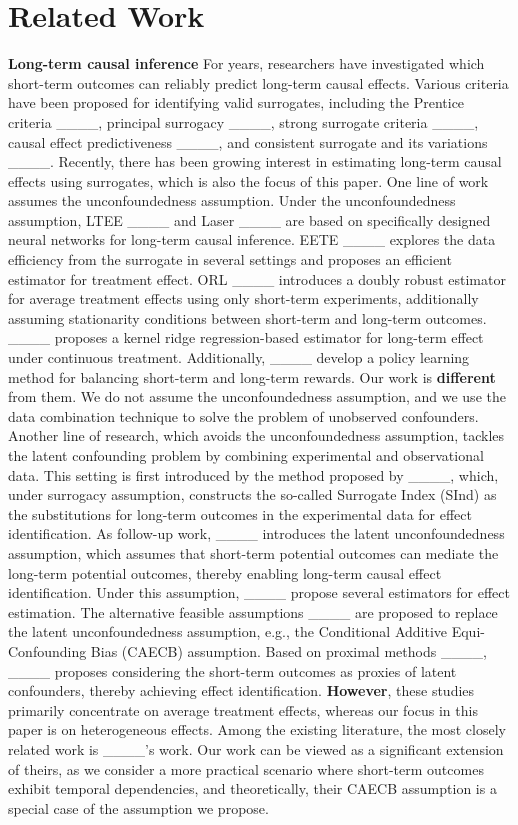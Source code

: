 \section{Related Work}
\label{related work}

\textbf{Long-term causal inference}
For years, researchers have investigated which short-term outcomes can reliably predict long-term causal effects.
Various criteria have been proposed for identifying valid surrogates, including the Prentice criteria ____, principal surrogacy ____, strong surrogate criteria ____, causal effect predictiveness ____, and consistent surrogate and its variations ____.
Recently, there has been growing interest in estimating long-term causal effects using surrogates, which is also the focus of this paper.
One line of work assumes the unconfoundedness assumption.
Under the unconfoundedness assumption, LTEE ____ and Laser ____ are based on specifically designed neural networks for long-term causal inference.
EETE ____ explores the data efficiency from the surrogate in several settings and proposes an efficient estimator for treatment effect.
ORL ____ introduces a doubly robust estimator for average treatment effects using only short-term experiments, additionally assuming stationarity conditions between short-term and long-term outcomes.
____ proposes a kernel ridge regression-based estimator for long-term effect under continuous treatment.
Additionally, ____ develop a policy learning method for balancing short-term and long-term rewards.
Our work is \textbf{different} from them. We do not assume the unconfoundedness assumption, and we use the data combination technique to solve the problem of unobserved confounders.
Another line of research, which avoids the unconfoundedness assumption, tackles the latent confounding problem by combining experimental and observational data.
This setting is first introduced by the method proposed by ____, 
which, under surrogacy assumption, constructs the so-called Surrogate Index (SInd) as the substitutions for long-term outcomes in the experimental data for effect identification.
As follow-up work, ____ introduces the latent unconfoundedness assumption, which assumes that short-term potential outcomes can mediate the long-term potential outcomes,  thereby enabling long-term causal effect identification.
Under this assumption, ____ propose several estimators for effect estimation.
The alternative feasible assumptions ____ are proposed to replace the latent unconfoundedness assumption, e.g., the Conditional Additive Equi-Confounding Bias (CAECB) assumption.
Based on proximal methods ____, ____ proposes considering the short-term outcomes as proxies of latent confounders, thereby achieving effect identification.
\textbf{However}, these studies primarily concentrate on average treatment effects, whereas our focus in this paper is on heterogeneous effects.
Among the existing literature, the most closely related work is ____'s work.
Our work can be viewed as a significant extension of theirs, as we consider a more practical scenario where short-term outcomes exhibit temporal dependencies, and theoretically, their CAECB assumption is a special case of the assumption we propose.


